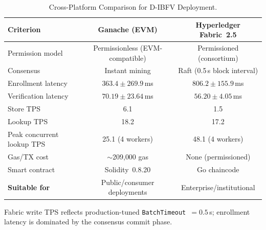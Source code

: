 \documentclass[3p,twocolumn]{elsarticle}
\newcommand{\DIBFV}{\textsf{D-IBFV}}
\begin{document}
\begin{table}[t]
\centering
\caption{Cross-Platform Comparison for \DIBFV{} Deployment.}
\label{tab:platform_comparison}
\begin{tabular}{@{}l c c@{}}
\toprule
\textbf{Criterion} & \textbf{Ganache (EVM)} & \textbf{Hyperledger Fabric~2.5} \\
\midrule
Permission model & Permissionless (EVM-compatible) & Permissioned (consortium) \\
Consensus & Instant mining & Raft (0.5\,s block interval) \\
Enrollment latency & $363.4 \pm 269.9$\,ms & $806.2 \pm 155.9$\,ms \\
Verification latency & $70.19 \pm 23.64$\,ms & $56.20 \pm 4.05$\,ms \\
Store TPS & 6.1 & 1.5 \\
Lookup TPS & 18.2 & 17.2 \\
Peak concurrent lookup TPS & 25.1 (4 workers) & 48.1 (4 workers) \\
Gas/TX cost & $\sim$209{,}000 gas & None (permissioned) \\
Smart contract & Solidity~0.8.20 & Go chaincode \\
\midrule
\textbf{Suitable for} & Public/consumer deployments & Enterprise/institutional \\
\bottomrule
\end{tabular}
\vspace{1mm}
\par\footnotesize Fabric write TPS reflects production-tuned \texttt{BatchTimeout}~$=0.5$\,s; enrollment latency is dominated by the consensus commit phase.
\end{table}
\end{document}
